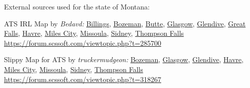 

















\vspace{2em}\footnoterule
{\footnotesize \noindent External sources used for the state of Montana:
\begin{description}[
	style=nextline,
	leftmargin=1.1em,
	labelsep=0pt,
	parsep=0pt,
	font=\normalfont,
]

\item[$\ast$]
ATS IRL Map by \textit{Bedavd:}
\hyperref[city:Billings]{Billings},
\hyperref[city:Bozeman]{Bozeman},
\hyperref[city:Butte]{Butte},
\hyperref[city:Glasgow]{Glasgow},
\hyperref[city:Glendive]{Glendive},
\hyperref[city:Great Falls]{Great Falls},
\hyperref[city:Havre]{Havre},
\hyperref[city:Miles City]{Miles City},
\hyperref[city:Missoula]{Missoula},
\hyperref[city:Sidney]{Sidney},
\hyperref[city:Thompson Falls]{Thompson Falls}
\\ \url{https://forum.scssoft.com/viewtopic.php?t=285700}

\item[$\dagger$]
Slippy Map for ATS by \textit{truckermudgeon:}
\hyperref[city:Bozeman]{Bozeman},
\hyperref[city:Glasgow]{Glasgow},
\hyperref[city:Glendive]{Glendive},
\hyperref[city:Havre]{Havre},
\hyperref[city:Miles City]{Miles City},
\hyperref[city:Missoula]{Missoula},
\hyperref[city:Sidney]{Sidney},
\hyperref[city:Thompson Falls]{Thompson Falls}
\\ \url{https://forum.scssoft.com/viewtopic.php?t=318267}

\end{description}
}
